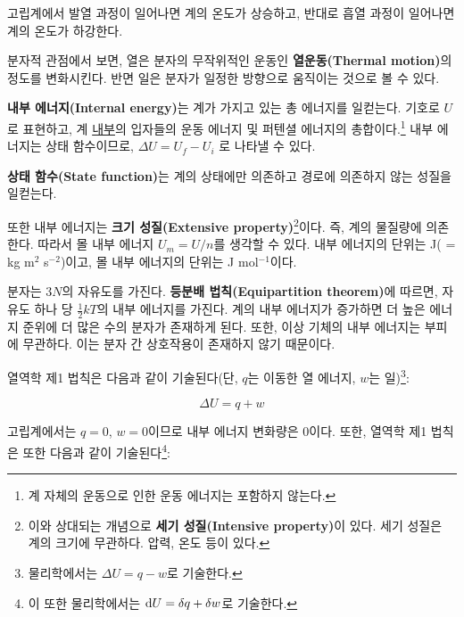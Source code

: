             고립계에서 발열 과정이 일어나면 계의 온도가 상승하고, 반대로 흡열 과정이 일어나면 계의 온도가 하강한다.
            \par 분자적 관점에서 보면, 열은 분자의 무작위적인 운동인 \textbf{열운동(Thermal motion)}의 정도를 변화시킨다. 반면 일은 
            분자가 일정한 방향으로 움직이는 것으로 볼 수 있다.
            \par \begin{defn}[내부 에너지]
                \textbf{내부 에너지(Internal energy)}는 계가 가지고 있는 총 에너지를 일컫는다. 기호로 $U$로 표현하고, 계 \underline{내부}의 입자들의 운동 에너지 
                및 퍼텐셜 에너지의 총합이다.\footnote[2]{계 자체의 운동으로 인한 운동 에너지는 포함하지 않는다.} 내부 에너지는 상태 함수이므로, $\Delta U = U_f - U_i$
            로 나타낼 수 있다.
            \end{defn}
            \begin{defn}[상태 함수]
            \textbf{상태 함수(State function)}는 계의 상태에만 의존하고 경로에 의존하지 않는 성질을 일컫는다.
            \end{defn}
            또한 내부 에너지는 
            \textbf{크기 성질(Extensive property)}\footnote[3]{이와 상대되는 개념으로 \textbf{세기 성질(Intensive property)}이 있다. 
            세기 성질은 계의 크기에 무관하다. 압력, 온도 등이 있다.}이다. 즉, 계의 물질량에 의존한다. 따라서 몰 내부 에너지 $U_m = U/n$를 생각할 수 있다. 
            내부 에너지의 단위는 J( = kg m$^2$ s$^{-2}$)이고, 몰 내부 에너지의 단위는 J mol$^{-1}$이다.
            \par 분자는 $3N$의 자유도를 가진다. \textbf{등분배 법칙(Equipartition theorem)}에 따르면, 자유도 하나 당 $\displaystyle\frac{1}{2}kT$의 내부 에너지를 가진다. 
            계의 내부 에너지가 증가하면 더 높은 에너지 준위에 더 많은 수의 분자가 존재하게 된다. 또한, 이상 기체의 내부 에너지는 부피에 무관하다. 이는 분자 간 상호작용이
            존재하지 않기 때문이다.
            \par 열역학 제1 법칙은 다음과 같이 기술된다(단, $q$는 이동한 열 에너지, $w$는 일)\footnote[4]{%
            물리학에서는 $\Delta U = q - w$로 기술한다.}:
            \begin{law}[열역학 제1 법칙]
                \begin{equation*}
                    \Delta U = q + w
                \end{equation*}
            \end{law}
            고립계에서는 $q=0$, $w=0$이므로 내부 에너지 변화량은 $0$이다. 또한, 열역학 제1 법칙은 또한 다음과 같이 기술된다\footnote[5]{%
            이 또한 물리학에서는 $\operatorname{d\!} U = \delta q + \delta w$로 기술한다.}:
